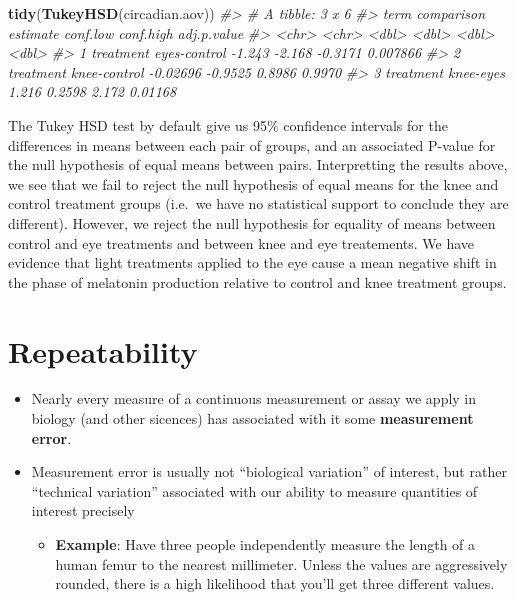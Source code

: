 \documentclass[]{book}
\newenvironment{Shaded}{\begin{snugshade}}{\end{snugshade}}
\newcommand{\CommentTok}[1]{\textcolor[rgb]{0.56,0.35,0.01}{\textit{#1}}}
\newcommand{\KeywordTok}[1]{\textcolor[rgb]{0.13,0.29,0.53}{\textbf{#1}}}
\newcommand{\NormalTok}[1]{#1}
\providecommand{\tightlist}{%
  \setlength{\itemsep}{0pt}\setlength{\parskip}{0pt}}
\theoremstyle{definition}
\theoremstyle{definition}
\theoremstyle{definition}
\theoremstyle{remark}
\begin{document}
\begin{Shaded}
\begin{Highlighting}[]
\KeywordTok{tidy}\NormalTok{(}\KeywordTok{TukeyHSD}\NormalTok{(circadian.aov))}
\CommentTok{#> # A tibble: 3 x 6}
\CommentTok{#>   term      comparison   estimate conf.low conf.high adj.p.value}
\CommentTok{#>   <chr>     <chr>           <dbl>    <dbl>     <dbl>       <dbl>}
\CommentTok{#> 1 treatment eyes-control -1.243    -2.168    -0.3171    0.007866}
\CommentTok{#> 2 treatment knee-control -0.02696  -0.9525    0.8986    0.9970  }
\CommentTok{#> 3 treatment knee-eyes     1.216     0.2598    2.172     0.01168}
\end{Highlighting}
\end{Shaded}

The Tukey HSD test by default give us 95\% confidence intervals for the
differences in means between each pair of groups, and an associated
P-value for the null hypothesis of equal means between pairs.
Interpretting the results above, we see that we fail to reject the null
hypothesis of equal means for the knee and control treatment groups
(i.e.~we have no statistical support to conclude they are different).
However, we reject the null hypothesis for equality of means between
control and eye treatments and between knee and eye treatements. We have
evidence that light treatments applied to the eye cause a mean negative
shift in the phase of melatonin production relative to control and knee
treatment groups.

\hypertarget{repeatability}{%
\section{Repeatability}\label{repeatability}}

\begin{itemize}
\item
  Nearly every measure of a continuous measurement or assay we apply in
  biology (and other sicences) has associated with it some
  \textbf{measurement error}.
\item
  Measurement error is usually not ``biological variation'' of interest,
  but rather ``technical variation'' associated with our ability to
  measure quantities of interest precisely

  \begin{itemize}
  \tightlist
  \item
    \textbf{Example}: Have three people independently measure the length
    of a human femur to the nearest millimeter. Unless the values are
    aggressively rounded, there is a high likelihood that you'll get
    three different values.
  \end{itemize}
\end{itemize}
\end{document}
